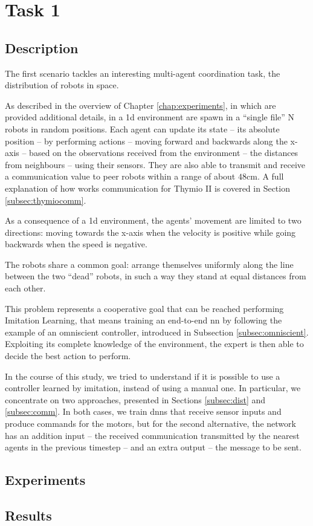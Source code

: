 \section{Task 1}
\label{sec:task1}

\subsection{Description}
\label{subsec:desc1}

The first scenario tackles an interesting multi-agent coordination task, the 
distribution of robots in space.

As described in the overview of Chapter \ref{chap:experiments}, in which are 
provided additional details, in a \gls{1d} environment are spawn in a ``single 
file'' N robots in random positions. %
Each agent can update its state – its absolute position – by performing actions – 
moving forward and backwards along the x-axis – based on the observations 
received from the environment – the distances from neighbours – using their 
sensors.  They are also able to transmit and receive a communication value to 
peer robots within a range of about $48$\gls{cm}. 
A full explanation of how works communication for Thymio II is covered in 
Section \ref{subsec:thymiocomm}.

As a consequence of a \gls{1d} environment, the agents' movement are 
limited to two directions: moving towards the x-axis when the velocity is positive 
while going backwards when the speed is negative. 

The robots share a common goal: arrange themselves uniformly along the 
line between the two ``dead'' robots, in such a way they stand at equal distances 
from each other.


This problem represents a cooperative goal that can be reached performing 
Imitation Learning, that means training an end-to-end \gls{nn} by following 
the example of an omniscient controller, introduced in Subsection 
\ref{subsec:omniscient}. 
Exploiting its complete knowledge of the environment, %
the expert is then able to decide the best action to perform.

In the course of this study, we tried to understand if it is possible to use a 
controller learned by imitation, instead of using a manual one. In particular, we 
concentrate on two approaches, presented in Sections \ref{subsec:dist} and 
\ref{subsec:comm}.
In both cases, we train \glspl{dnn} that receive sensor inputs and produce 
commands for the motors, but for the second alternative, the network has an 
addition input – the received communication transmitted by the nearest agents in 
the previous timestep – and an extra output – the message to be sent.

\subsection{Experiments}
\label{subsec:ex1}

\subsection{Results}
\label{subsec:results1}

